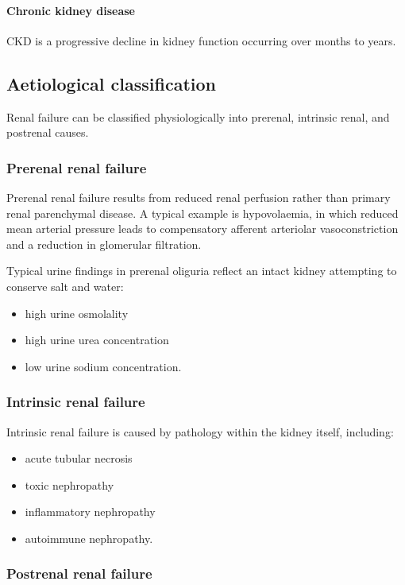 \documentclass[11pt,a4paper]{article}
\begin{document}
\paragraph{Chronic kidney disease}
CKD is a progressive decline in kidney function occurring over months to years.\cite{KamPowerRenalFailure}

\subsection{Aetiological classification}

Renal failure can be classified physiologically into prerenal, intrinsic renal, and postrenal causes.

\subsubsection{Prerenal renal failure}

Prerenal renal failure results from reduced renal perfusion rather than primary renal parenchymal disease. A typical example is hypovolaemia, in which reduced mean arterial pressure leads to compensatory afferent arteriolar vasoconstriction and a reduction in glomerular filtration.

Typical urine findings in prerenal oliguria reflect an intact kidney attempting to conserve salt and water:
\begin{itemize}
  \item high urine osmolality
  \item high urine urea concentration
  \item low urine sodium concentration.
\end{itemize}

\subsubsection{Intrinsic renal failure}

Intrinsic renal failure is caused by pathology within the kidney itself, including:
\begin{itemize}
  \item acute tubular necrosis
  \item toxic nephropathy
  \item inflammatory nephropathy
  \item autoimmune nephropathy.
\end{itemize}

\subsubsection{Postrenal renal failure}
\end{document}
